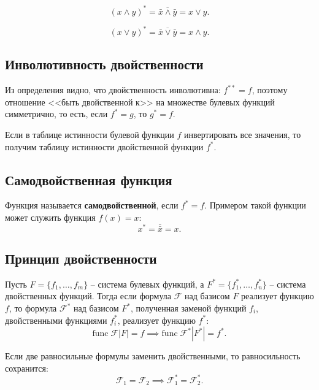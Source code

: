 \begin{example}
    \[
        (x \land y)^* = \overline{\bar{x} \land \bar{y}} = x \lor y.
    \]
\end{example}

\begin{example}
    \[
        (x \lor y)^* = \overline{\bar{x} \lor \bar{y}} = x \land y.
    \]
\end{example}

\subsection{Инволютивность двойственности}

Из определения видно, что двойственность инволютивна: \(f^{**} = f\), поэтому отношение <<быть двойственной к>> на множестве булевых функций симметрично, то есть, если \(f^* = g\), то \(g^* = f\).

Если в таблице истинности булевой функции \(f\) инвертировать все значения, то получим таблицу истинности двойственной функции \(f^*\).

\subsection{Самодвойственная функция}

Функция называется \textbf{самодвойственной}, если \(f^* = f\). Примером такой функции может служить функция \(f(x) = x\):
\[
    x^* = \bar{\bar{x}} = x.
\]

\subsection{Принцип двойственности}

\begin{theorem*}
    Пусть \(F = \{f_1, \ldots, f_m\}\) -- система булевых функций, а \(F^* = \{f_1^*, \ldots, f_n^*\}\) -- система двойственных функций. Тогда если формула \(\mathcal{F}\) над базисом \(F\) реализует функцию \(f\), то формула \(\mathcal{F}^*\) над базисом \(F^*\), полученная заменой функций \(f_i\), двойственными функциями \(f_i^*\), реализует функцию \(f^*\):
    \[
        \text{func} \; \mathcal{F} |F| = f
        \implies
        \text{func} \; \mathcal{F}^* |F^*| = f^*.
    \]

    \begin{consequence*}
        Если две равносильные формулы заменить двойственными, то равносильность сохранится:
        \[
            \mathcal{F}_1 = \mathcal{F}_2
            \implies
            \mathcal{F}_1^* = \mathcal{F}_2^*.
        \]
    \end{consequence*}
\end{theorem*}

